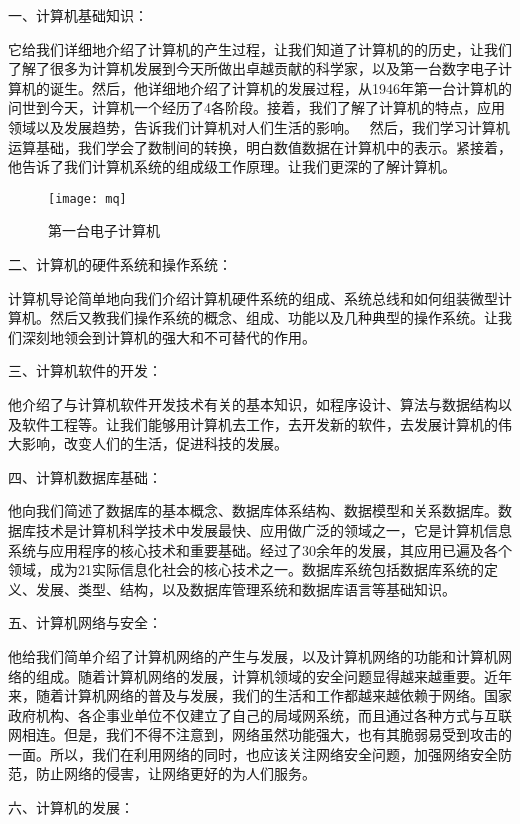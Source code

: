\documentclass{article}
\begin{document}
一、计算机基础知识：\par
它给我们详细地介绍了计算机的产生过程，让我们知道了计算机的的历史，让我们了解了很多为计算机发展到今天所做出卓越贡献的科学家，以及第一台数字电子计算机的诞生。然后，他详细地介绍了计算机的发展过程，从1946年第一台计算机的问世到今天，计算机一个经历了4各阶段。接着，我们了解了计算机的特点，应用领域以及发展趋势，告诉我们计算机对人们生活的影响。  然后，我们学习计算机运算基础，我们学会了数制间的转换，明白数值数据在计算机中的表示。紧接着，他告诉了我们计算机系统的组成级工作原理。让我们更深的了解计算机。\par
\begin{figure}[h!]
\centering
\texttt{[image: mq]}
\caption{第一台电子计算机}
\label{fig:mq}
\end{figure}
二、计算机的硬件系统和操作系统：\par
计算机导论简单地向我们介绍计算机硬件系统的组成、系统总线和如何组装微型计算机。然后又教我们操作系统的概念、组成、功能以及几种典型的操作系统。让我们深刻地领会到计算机的强大和不可替代的作用。\par
三、计算机软件的开发：\par
他介绍了与计算机软件开发技术有关的基本知识，如程序设计、算法与数据结构以及软件工程等。让我们能够用计算机去工作，去开发新的软件，去发展计算机的伟大影响，改变人们的生活，促进科技的发展。\par
四、计算机数据库基础：\par
他向我们简述了数据库的基本概念、数据库体系结构、数据模型和关系数据库。数据库技术是计算机科学技术中发展最快、应用做广泛的领域之一，它是计算机信息系统与应用程序的核心技术和重要基础。经过了30余年的发展，其应用已遍及各个领域，成为21实际信息化社会的核心技术之一。数据库系统包括数据库系统的定义、发展、类型、结构，以及数据库管理系统和数据库语言等基础知识。\par
五、计算机网络与安全：\par
他给我们简单介绍了计算机网络的产生与发展，以及计算机网络的功能和计算机网络的组成。随着计算机网络的发展，计算机领域的安全问题显得越来越重要。近年来，随着计算机网络的普及与发展，我们的生活和工作都越来越依赖于网络。国家政府机构、各企事业单位不仅建立了自己的局域网系统，而且通过各种方式与互联网相连。但是，我们不得不注意到，网络虽然功能强大，也有其脆弱易受到攻击的一面。所以，我们在利用网络的同时，也应该关注网络安全问题，加强网络安全防范，防止网络的侵害，让网络更好的为人们服务。\par
六、计算机的发展：\par
\end{document}
